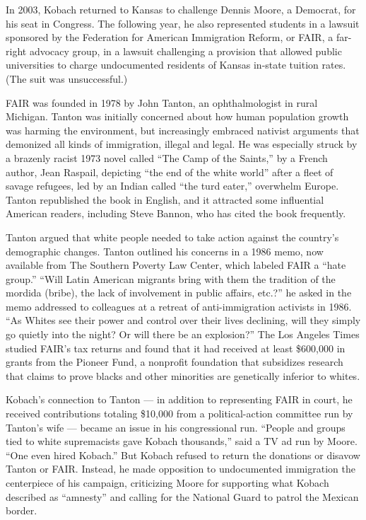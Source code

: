 In 2003, Kobach returned to Kansas to challenge Dennis Moore, a
Democrat, for his seat in Congress. The following year, he also
represented students in a lawsuit sponsored by the Federation for
American Immigration Reform, or FAIR, a far-right advocacy group, in a
lawsuit challenging a provision that allowed public universities to
charge undocumented residents of Kansas in-state tuition rates. (The
suit was unsuccessful.)

FAIR was founded in 1978 by John Tanton, an ophthalmologist in rural
Michigan. Tanton was initially concerned about how human population
growth was harming the environment, but increasingly embraced nativist
arguments that demonized all kinds of immigration, illegal and legal. He
was especially struck by a brazenly racist 1973 novel called ``The Camp
of the Saints,'' by a French author, Jean Raspail, depicting ``the end
of the white world'' after a fleet of savage refugees, led by an Indian
called ``the turd eater,'' overwhelm Europe. Tanton republished the book
in English, and it attracted some influential American readers,
including Steve Bannon, who has cited the book frequently.

Tanton argued that white people needed to take action against the
country's demographic changes. Tanton outlined his concerns in a 1986
memo, now available from The Southern Poverty Law Center, which labeled
FAIR a ``hate group.'' ``Will Latin American migrants bring with them
the tradition of the mordida (bribe), the lack of involvement in public
affairs, etc.?'' he asked in the memo addressed to colleagues at a
retreat of anti-immigration activists in 1986. ``As Whites see their
power and control over their lives declining, will they simply go
quietly into the night? Or will there be an explosion?'' The Los Angeles
Times studied FAIR's tax returns and found that it had received at least
\$600,000 in grants from the Pioneer Fund, a nonprofit foundation that
subsidizes research that claims to prove blacks and other minorities are
genetically inferior to whites.

Kobach's connection to Tanton --- in addition to representing FAIR in
court, he received contributions totaling \$10,000 from a
political-action committee run by Tanton's wife --- became an issue in
his congressional run. ``People and groups tied to white supremacists
gave Kobach thousands,'' said a TV ad run by Moore. ``One even hired
Kobach.'' But Kobach refused to return the donations or disavow Tanton
or FAIR. Instead, he made opposition to undocumented immigration the
centerpiece of his campaign, criticizing Moore for supporting what
Kobach described as ``amnesty'' and calling for the National Guard to
patrol the Mexican border.

